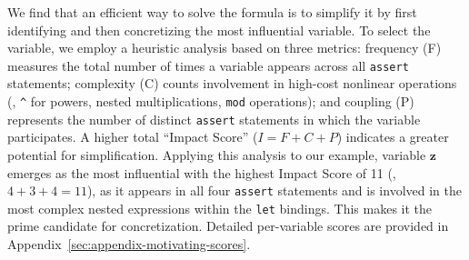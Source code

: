 
We find that an efficient way to solve the formula is to simplify it by first identifying and then concretizing the most influential variable. To select the variable, we employ a heuristic analysis based on three metrics: frequency (F) measures the total number of times a variable appears across all \texttt{assert} statements; complexity (C) counts involvement in high-cost nonlinear operations (\eg, \texttt{\textasciicircum{}} for powers, nested multiplications, \texttt{mod} operations); and coupling (P) represents the number of distinct \texttt{assert} statements in which the variable participates. A higher total ``Impact Score'' ($I = F+C+P$) indicates a greater potential for simplification. Applying this analysis to our example, variable $\mathbf{z}$ emerges as the most influential with the highest Impact Score of 11 (\ie, $4+3+4=11$), as it appears in all four \texttt{assert} statements and is involved in the most complex nested expressions within the \texttt{let} bindings. This makes it the prime candidate for concretization. Detailed per-variable scores are provided in Appendix~\ref{sec:appendix-motivating-scores}.


